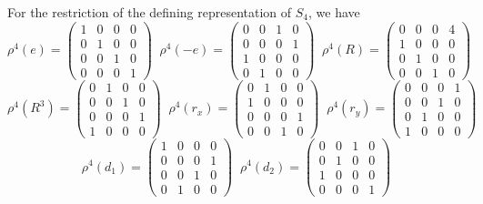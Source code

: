 \documentclass[]{ctexart}
\begin{document}
For the restriction of the defining representation of $S_4$, we have 
\begin{equation*}
\rho^4(e)=\begin{pmatrix}
1 & 0 & 0 & 0\\
0 & 1 & 0 & 0\\
0 & 0 & 1 & 0\\
0 & 0 & 0 & 1
\end{pmatrix}\;\;\rho^4(-e)=\begin{pmatrix}
0 & 0 & 1 & 0\\
0 & 0 & 0 & 1\\
1 & 0 & 0 & 0\\
0 & 1 & 0 & 0
\end{pmatrix}\;\;\rho^4(R)=\begin{pmatrix}
0 & 0 & 0 & 4\\
1 & 0 & 0 & 0\\
0 & 1 & 0 & 0\\
0 & 0 & 1 & 0
\end{pmatrix}
\end{equation*}
\begin{equation*}
\rho^4(R^3)=\begin{pmatrix}
0 & 1 & 0 & 0\\
0 & 0 & 1 & 0\\
0 & 0 & 0 & 1\\
1 & 0 & 0 & 0
\end{pmatrix}\;\;\rho^4(r_x)=\begin{pmatrix}
0 & 1 & 0 & 0\\
1 & 0 & 0 & 0\\
0 & 0 & 0 & 1\\
0 & 0 & 1 & 0
\end{pmatrix}\;\;\rho^4(r_y)=\begin{pmatrix}
0 & 0 & 0 & 1\\
0 & 0 & 1 & 0\\
0 & 1 & 0 & 0\\
1 & 0 & 0 & 0
\end{pmatrix}
\end{equation*}
\begin{equation*}
\rho^4(d_1)=\begin{pmatrix}
1 & 0 & 0 & 0\\
0 & 0 & 0 & 1\\
0 & 0 & 1 & 0\\
0 & 1 & 0 & 0
\end{pmatrix}\;\;\rho^4(d_2)=\begin{pmatrix}
0 & 0 & 1 & 0\\
0 & 1 & 0 & 0\\
1 & 0 & 0 & 0\\
0 & 0 & 0 & 1
\end{pmatrix}
\end{equation*}
\end{document}
